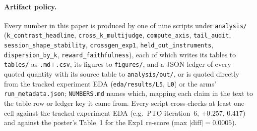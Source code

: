 \paragraph{Artifact policy.} Every number in this paper is produced by one of nine scripts under
\texttt{analysis/} (\texttt{k\_contrast\_headline}, \texttt{cross\_k\_multijudge},
\texttt{compute\_axis}, \texttt{tail\_audit}, \texttt{session\_shape\_stability},
\texttt{crossgen\_exp1}, \texttt{held\_out\_instruments}, \texttt{dispersion\_by\_k},
\texttt{reward\_faithfulness}), each of which writes its tables to \texttt{tables/} as
\texttt{.md}$+$\texttt{.csv}, its figures to \texttt{figures/}, and a JSON ledger of every
quoted quantity with its source table to \texttt{analysis/out/}, or is quoted directly from the
tracked experiment EDA (\texttt{eda/results/L5}, \texttt{L0}) or the arms'
\texttt{run\_metadata.json}; \texttt{NUMBERS.md} names which, mapping each claim in the text to
the table row or ledger key it came from. Every script cross-checks at least
one cell against the tracked experiment EDA (e.g.\ PTO \QQ{} iteration~6, $+0.257$, \dz{} $0.417$)
and against the poster's Table~1 for the Exp1 re-score (max $|\text{diff}| = 0.0005$).
